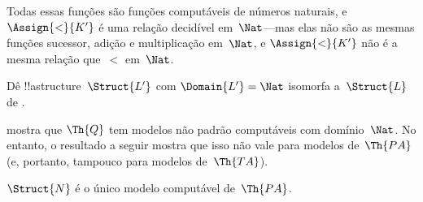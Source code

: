 \documentclass[../../../include/open-logic-section]{subfiles}
\begin{document}
\begin{ex}
Todas essas funções são funções computáveis de números naturais, e
$\Assign{<}{K'}$ é uma relação decidível em~$\Nat$---mas elas não são
as mesmas funções sucessor, adição e multiplicação em~$\Nat$, e
$\Assign{<}{K'}$ não é a mesma relação que~$<$ em~$\Nat$.
\end{ex}

\begin{prob}
Dê !!a{structure}~$\Struct{L'}$ com $\Domain{L'} = \Nat$ isomorfa
a~$\Struct{L}$ de .
\end{prob}

\begin{explain}
 mostra que $\Th{Q}$ tem modelos não padrão
computáveis com domínio~$\Nat$. No entanto, o resultado a seguir
mostra que isso não vale para modelos de~$\Th{PA}$ (e, portanto,
tampouco para modelos de~$\Th{TA}$).
\end{explain}

\begin{thm}
$\Struct{N}$ é o único modelo computável de~$\Th{PA}$.
\end{thm}
  
\end{document}
